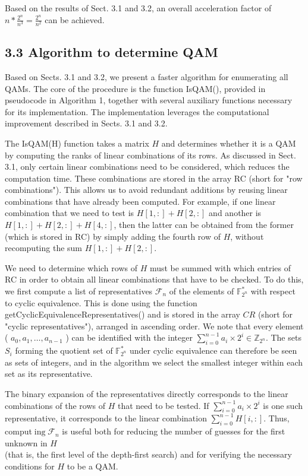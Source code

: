 \documentclass[10pt]{article}
\begin{document}
Based on the results of Sect. 3.1 and 3.2, an overall acceleration factor of $n * \frac{2^{n}}{n^{3}}=\frac{2^{n}}{n^{2}}$ can be achieved.

\subsection*{3.3 Algorithm to determine QAM}
Based on Sects. 3.1 and 3.2, we present a faster algorithm for enumerating all QAMs. The core of the procedure is the function IsQAM(), provided in pseudocode in Algorithm 1, together with several auxiliary functions necessary for its implementation. The implementation leverages the computational improvement described in Sects. 3.1 and 3.2.

The IsQAM(H) function takes a matrix $H$ and determines whether it is a QAM by computing the ranks of linear combinations of its rows. As discussed in Sect. 3.1, only certain linear combinations need to be considered, which reduces the computation time. These combinations are stored in the array RC (short for "row combinations"). This allows us to avoid redundant additions by reusing linear combinations that have already been computed. For example, if one linear combination that we need to test is $H[1,:]+H[2,:]$ and another is $H[1,:]+H[2,:]+H[4,:]$, then the latter can be obtained from the former (which is stored in RC) by simply adding the fourth row of $H$, without recomputing the sum $H[1,:]+H[2,:]$.

We need to determine which rows of $H$ must be summed with which entries of RC in order to obtain all linear combinations that have to be checked. To do this, we first compute a list of representatives $\mathcal{F}_{n}$ of the elements of $\mathbb{F}_{2^{n}}^{*}$ with respect to cyclic equivalence. This is done using the function getCyclicEquivalenceRepresentatives() and is stored in the array $C R$ (short for "cyclic representatives"), arranged in ascending order. We note that every element ( $a_{0}, a_{1}, \ldots, a_{n-1}$ ) can be identified with the integer $\sum_{i=0}^{n-1} a_{i} \times 2^{i} \in \mathbb{Z}_{2^{n}}$. The sets $S_{i}$ forming the quotient set of $\mathbb{F}_{2^{n}}^{*}$ under cyclic equivalence can therefore be seen as sets of integers, and in the algorithm we select the smallest integer within each set as its representative.

The binary expansion of the representatives directly corresponds to the linear combinations of the rows of $H$ that need to be tested. If $\sum_{i=0}^{n-1} a_{i} \times 2^{i}$ is one such representative, it corresponds to the linear combination $\sum_{i=0}^{n-1} H[i,:]$. Thus, comput$\operatorname{ing} \mathcal{F}_{n}$ is useful both for reducing the number of guesses for the first unknown in $H$\\
(that is, the first level of the depth-first search) and for verifying the necessary conditions for $H$ to be a QAM.
\end{document}
